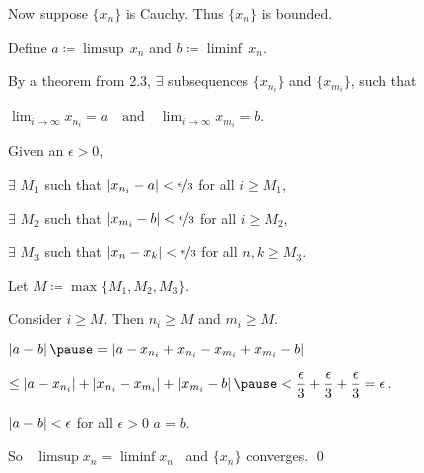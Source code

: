 \documentclass[10pt,aspectratio=149]{beamer}
\begin{document}
\begin{frame}

Now suppose $\{ x_n \}$ is Cauchy.  \pause Thus $\{x_n\}$ is bounded.

\pause
\medskip

Define $a \coloneqq \limsup \, x_n$ and $b \coloneqq \liminf \, x_n$.

\pause
By a theorem from 2.3, $\exists$ subsequences
$\{ x_{n_i} \}$ and
$\{ x_{m_i} \}$, such that

$\displaystyle
\lim_{i\to\infty} x_{n_i} = a
\quad \text{and} \quad
\lim_{i\to\infty} x_{m_i} = b$.

\pause
\medskip

Given an $\epsilon > 0$,

\pause
$\exists$
$M_1$ such that
$\left\lvert {x_{n_i} - a} \right\rvert < \nicefrac{\epsilon}{3}$ for all $i \geq M_1$,

\pause
$\exists$
$M_2$ such that
$\left\lvert {x_{m_i} - b} \right\rvert < \nicefrac{\epsilon}{3}$ for all $i \geq M_2$,

\pause
$\exists$
$M_3$ such that
$\left\lvert {x_n-x_k} \right\rvert < \nicefrac{\epsilon}{3}$ for all $n,k \geq M_3$.

\pause
Let $M \coloneqq \max \{ M_1, M_2, M_3 \}$.

\pause
\medskip

Consider $i \geq M$. \pause  Then $n_i \geq M$ and $m_i \geq M$.

\pause
\medskip

\thus\quad
$\displaystyle
\abs{a-b}
\pause
=
\abs{a-x_{n_i}+x_{n_i}
-x_{m_i}+x_{m_i}
-b} 
$

\pause
\medskip

\qquad\qquad
$\displaystyle
\leq
\abs{a-x_{n_i}}
+ \abs{x_{n_i} -x_{m_i}}
+ \abs{x_{m_i} -b} 
\pause
 <
\frac{\epsilon}{3}
+
\frac{\epsilon}{3}
+
\frac{\epsilon}{3}
= \epsilon$.

\pause
\medskip

$\left\lvert {a-b} \right\rvert < \epsilon$ for all $\epsilon > 0$ \wthus $a=b$.

\pause
\medskip

So ~$\limsup x_n = \liminf x_n$~ and $\{ x_n \}$ converges.
\qed

\end{frame}
\end{document}
